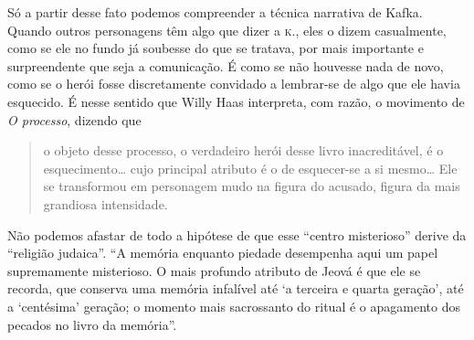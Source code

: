 Só a partir desse fato podemos compreender a técnica narrativa de Kafka.
Quando outros personagens têm algo que dizer a \textsc{k.}, eles o dizem
casualmente, como se ele no fundo já soubesse do que se tratava, por
mais importante e surpreendente que seja a comunicação. É como se não
houvesse nada de novo, como se o herói fosse discretamente convidado a
lembrar-se de algo que ele havia esquecido. É nesse sentido que Willy
Haas interpreta, com razão, o movimento de \textit{O processo}, dizendo que 

\begin{quote}
o objeto desse processo, o verdadeiro herói desse livro inacreditável, é o
esquecimento\ldots{} cujo principal atributo é o de esquecer-se a si mesmo\ldots{}
Ele se transformou em personagem mudo na figura do acusado, figura da
mais grandiosa intensidade. 
\end{quote}

Não podemos afastar de todo a hipótese de
que esse ``centro misterioso'' derive da ``religião judaica''. ``A
memória enquanto piedade desempenha aqui um papel supremamente
misterioso. O mais profundo atributo de Jeová é que ele se recorda, que
conserva uma memória infalível até `a terceira e quarta geração', até a
`centésima' geração; o momento mais sacrossanto do ritual é o apagamento
dos pecados no livro da memória''.

